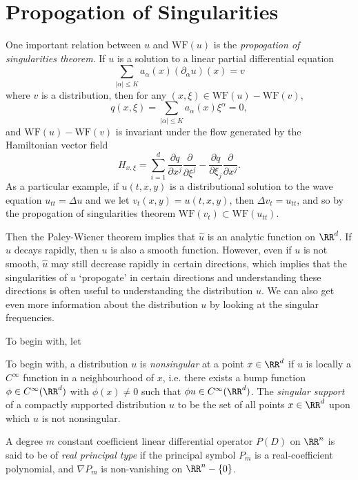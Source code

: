 \section{Propogation of Singularities}

One important relation between $u$ and $\text{WF}(u)$ is the \emph{propogation of singularities theorem}. If $u$ is a solution to a linear partial differential equation
%
\[ \sum_{|\alpha| \leq K} a_\alpha(x) (\partial_\alpha u)(x) = v \]
%
where $v$ is a distribution, then for any $(x,\xi) \in \text{WF}(u) - \text{WF}(v)$,
%
\[ q(x,\xi) = \sum_{|\alpha| \leq K} a_\alpha(x) \xi^\alpha = 0, \]
%
and $\text{WF}(u) - \text{WF}(v)$ is invariant under the flow generated by the Hamiltonian vector field
%
\[ H_{x,\xi} = \sum_{i = 1}^d \frac{\partial q}{\partial x^j} \frac{\partial}{\partial \xi^j} - \frac{\partial q}{\partial \xi_j} \frac{\partial}{\partial x^j}. \]
%
As a particular example, if $u(t,x,y)$ is a distributional solution to the wave equation $u_{tt} = \Delta u$ and we let $v_t(x,y) = u(t,x,y)$, then $\Delta v_t = u_{tt}$, and so by the propogation of singularities theorem $\text{WF}(v_t) \subset \text{WF}(u_{tt})$.

Then the Paley-Wiener theorem implies that $\widehat{u}$ is an analytic function on $\RR^d$. If $\widehat{u}$ decays rapidly, then $u$ is also a smooth function. However, even if $u$ is not smooth, $\widehat{u}$ may still decrease rapidly in certain directions, which implies that the singularities of $u$ `propogate' in certain directions and understanding these directions is often useful to understanding the distribution $u$. We can also get even more information about the distribution $u$ by looking at the singular frequencies.

To begin with, let 

To begin with, a distribution $u$ is \emph{nonsingular} at a point $x \in \RR^d$ if $u$ is locally a $C^\infty$ function in a neighbourhood of $x$, i.e. there exists a bump function $\phi \in C^\infty(\RR^d)$ with $\phi(x) \neq 0$ such that $\phi u \in C^\infty(\RR^d)$. The  \emph{singular support} of a compactly supported distribution $u$ to be the set of all points $x \in \RR^d$ upon which $u$ is not nonsingular.

\newpage

A degree $m$ constant coefficient linear differential operator $P(D)$ on $\RR^n$ is said to be of \emph{real principal type} if the principal symbol $P_m$ is a real-coefficient polynomial, and $\nabla P_m$ is non-vanishing on $\RR^n - \{ 0 \}$.

